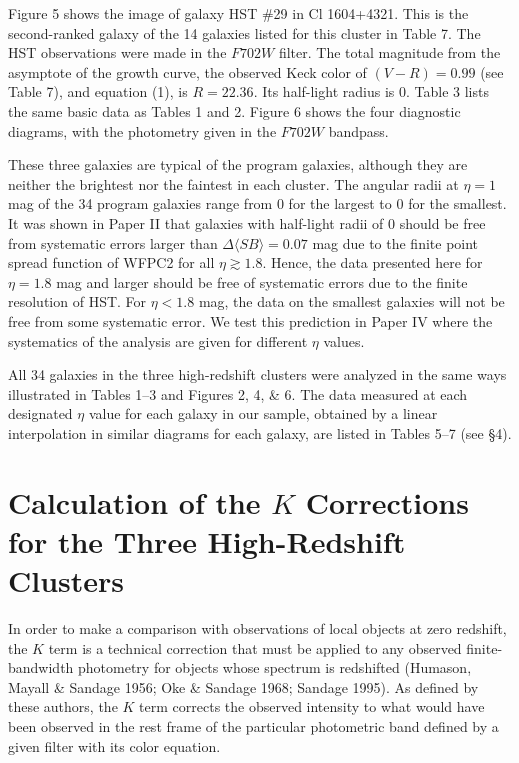 \documentclass[preprint]{aastex}
\begin{document}
Figure 5 shows the image of galaxy HST \#29 in Cl 1604+4321. This is
the second-ranked galaxy of the 14 galaxies listed for this cluster in
Table 7. The HST observations were made in the $F702W$ filter. The
total magnitude from the asymptote of the growth curve, the observed
Keck color of $(V-R) = 0.99$ (see Table 7), and equation (1), is $R =
22.36$. Its half-light radius is 0. Table 3 lists the same
basic data as Tables 1 and 2. Figure 6 shows the four diagnostic
diagrams, with the photometry given in the $F702W$ bandpass.

These three galaxies are typical of the program galaxies, although
they are neither the brightest nor the faintest in each cluster. The
angular radii at $\eta = 1$ mag of the 34 program galaxies range from
0 for the largest to 0 for the smallest. It was
shown in Paper II that galaxies with half-light radii of 0
should be free from systematic errors larger than $\Delta \langle SB
\rangle = 0.07$ mag due to the finite point spread function of WFPC2
for all $\eta \gtrsim 1.8$. Hence, the data presented here for $\eta =
1.8$ mag and larger should be free of systematic errors due to the
finite resolution of HST. For $\eta < 1.8$ mag, the data on the
smallest galaxies will not be free from some systematic error. We test
this prediction in Paper IV where the systematics of the analysis are
given for different $\eta$ values.

All 34 galaxies in the three high-redshift clusters were analyzed in
the same ways illustrated in Tables 1--3 and Figures 2, 4, \& 6. The
data measured at each designated $\eta$ value for each galaxy in our
sample, obtained by a linear interpolation in similar diagrams for
each galaxy, are listed in Tables 5--7 (see \S 4).

\section{Calculation of the $K$ Corrections for the Three 
High-Redshift Clusters}

In order to make a comparison with observations of local objects at
zero redshift, the $K$ term is a technical correction that must be
applied to any observed finite-bandwidth photometry for objects whose
spectrum is redshifted (Humason, Mayall \& Sandage 1956; Oke \&
Sandage 1968; Sandage 1995). As defined by these authors, the $K$ term
corrects the observed intensity to what would have been observed in
the rest frame of the particular photometric band defined by a given
filter with its color equation.
\end{document}
